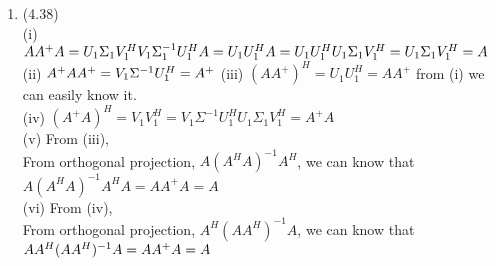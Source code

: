 \documentclass[letterpaper,12pt]{article}
\theoremstyle{definition}
\begin{document}
\begin{enumerate}
 	\item (4.38) \\
(i) $AA^+A = U_1\Sigma_1V_1^HV_1\Sigma_1^{-1}U_1^HA = U_1U_1^HA = U_1U_1^HU_1\Sigma_1V_1^H = U_1\Sigma_1V_1^H =A \\$
(ii) $A^+AA^+=V_1\Sigma^{-1}U_1^H = A^+\\$
(iii) $(AA^+)^H=U_1U_1^H=AA^+$ from (i) we can easily know it.\\
(iv) $ (A^+A)^H = V_1V_1^H = V_1\Sigma^{-1}U_1^HU_1\Sigma_1V_1^H = A^+A $\\
(v) From (iii),\\
From orthogonal projection, $A(A^HA)^{-1}A^H$, we can know that $A(A^HA)^{-1}A^HA = AA^+A = A$ \\
(vi) From (iv),\\
From orthogonal projection, $A^H(AA^H)^{-1}A$, we can know that $AA^H(AA^H)^{-1}A = AA^+A = A\\
$






















\end{enumerate}

\vspace{25mm}


\end{document}
